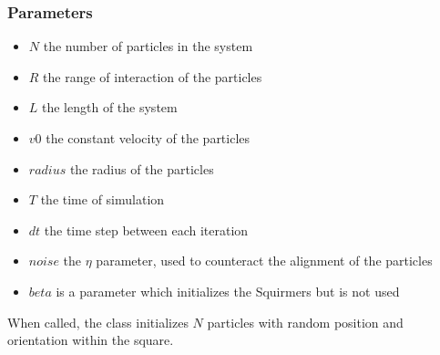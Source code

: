 \documentclass{article}
\begin{document}
\subsubsection*{Parameters}
\begin{itemize}
    \item $N$ the number of particles in the system
    \item $R$ the range of interaction of the particles
    \item $L$ the length of the system
    \item $v0$ the constant velocity of the particles
    \item $radius$ the radius of the particles
    \item $T$ the time of simulation
    \item $dt$ the time step between each iteration
    \item $noise$ the $\eta$ parameter, used to counteract the alignment of the particles
    \item $beta$ is a parameter which initializes the Squirmers but
    is not used
\end{itemize}
When called, the class initializes $N$ particles with random position and orientation within the square.
\end{document}
